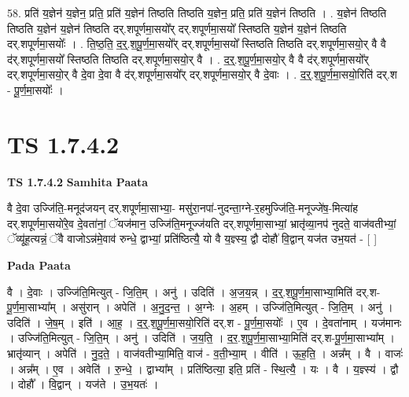 \documentclass[17pt]{extarticle}
\begin{document}
58. प्रति॑ य॒ज्ञेन॑ य॒ज्ञेन॒ प्रति॒ प्रति॑ य॒ज्ञेन॑ तिष्ठति तिष्ठति य॒ज्ञेन॒ प्रति॒ प्रति॑ य॒ज्ञेन॑ तिष्ठति । . य॒ज्ञेन॑ तिष्ठति तिष्ठति य॒ज्ञेन॑ य॒ज्ञेन॑ तिष्ठति दर्.शपूर्णमा॒सयो᳚र् दर्.शपूर्णमा॒सयो᳚ स्तिष्ठति य॒ज्ञेन॑ य॒ज्ञेन॑ तिष्ठति दर्.शपूर्णमा॒सयोः᳚ । . ति॒ष्ठ॒ति॒ द॒र्॒.श॒पू॒र्ण॒मा॒सयो᳚र् दर्.शपूर्णमा॒सयो᳚ स्तिष्ठति तिष्ठति दर्.शपूर्णमा॒सयो॒र् 
वै वै द॑र्.शपूर्णमा॒सयो᳚ स्तिष्ठति तिष्ठति दर्.शपूर्णमा॒सयो॒र् वै । . द॒र्॒.श॒पू॒र्ण॒मा॒सयो॒र् वै वै द॑र्.शपूर्णमा॒सयो᳚र् दर्.शपूर्णमा॒सयो॒र् वै दे॒वा दे॒वा वै 
द॑र्.शपूर्णमा॒सयो᳚र् दर्.शपूर्णमा॒सयो॒र् वै दे॒वाः । . द॒र्॒.श॒पू॒र्ण॒मा॒सयो॒रिति॑ दर्.श - पू॒र्ण॒मा॒सयोः᳚ । \newline
\pagebreak
{}
\section*{ TS 1.7.4.2 }

\textbf{TS 1.7.4.2 } \newline
\textbf{Samhita Paata} \newline

वै दे॒वा उज्जि॑ति॒-मनूद॑जयन् दर्.शपूर्णमा॒साभ्या॒- मसु॑रा॒नपा॑-नुदन्ता॒ग्ने-र॒हमुज्जि॑ति॒-मनूज्जे॑ष॒-मित्या॑ह दर्.शपूर्णमा॒सयो॑रे॒व दे॒वता॑नां॒ ॅयज॑मान॒ उज्जि॑ति॒मनूज्ज॑यति दर्.शपूर्णमा॒साभ्यां॒ भ्रातृ॑व्या॒नप॑ नुदते॒ वाज॑वतीभ्यां॒ ॅव्यू॑ह॒त्यन्नं॒ ॅवै वाजोऽन्न॑मे॒वाव॑ रुन्धे॒ द्वाभ्यां॒ प्रति॑ष्ठित्यै॒ यो वै य॒ज्ञ्स्य॒ द्वौ दोहौ॑ वि॒द्वान् यज॑त उभ॒यत॑ - [ ] \newline

\textbf{Pada Paata} \newline

वै । दे॒वाः । उज्जि॑ति॒मित्युत् - जि॒ति॒म् । अनु॑ । उदिति॑ । अ॒ज॒य॒न्न् । द॒र्॒.श॒पू॒र्ण॒मा॒साभ्या॒मिति॑ दर्.श-पू॒र्ण॒मा॒साभ्या᳚म् । असु॑रान् । अपेति॑ । अ॒नु॒द॒न्त॒ । अ॒ग्नेः । अ॒हम् । उज्जि॑ति॒मित्युत् - जि॒ति॒म् । अनु॑ । उदिति॑ । जे॒ष॒म् । इति॑ । आ॒ह॒ । द॒र्॒.श॒पू॒र्ण॒मा॒सयो॒रिति॑ दर्.श - पू॒र्ण॒मा॒सयोः᳚ । ए॒व । दे॒वता॑नाम् । यज॑मानः । उज्जि॑ति॒मित्युत् - जि॒ति॒म् । अनु॑ । उदिति॑ । ज॒य॒ति॒ । द॒र॒.श॒पू॒र्ण॒मा॒साभ्या॒मिति॑ दर्.श-पू॒र्ण॒मा॒साभ्या᳚म् । भ्रातृ॑व्यान् । अपेति॑ । नु॒द॒ते॒ । वाज॑वतीभ्या॒मिति॒ वाज॑ - व॒ती॒भ्या॒म् । वीति॑ । ऊ॒ह॒ति॒ । अन्न᳚म् । वै । वाजः॑ । अन्न᳚म् । ए॒व । अवेति॑ । रु॒न्धे॒ । द्वाभ्या᳚म् । प्रति॑ष्ठित्या॒ इति॒ प्रति॑ - स्थि॒त्यै॒ । यः । वै । य॒ज्ञ्स्य॑ । द्वौ । दोहौ᳚ । वि॒द्वान् । यज॑ते । उ॒भ॒यतः॑ ।  \newline
\end{document}
